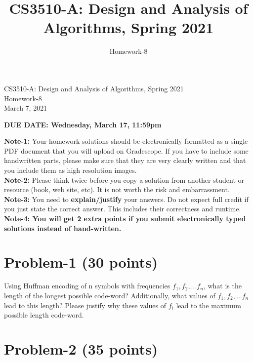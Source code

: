 \documentclass[11pt]{article}
\title{CS3510-A: Design and Analysis of Algorithms, Spring 2021}
\author{Homework-8}
\begin{document}
\begin{center}
    
    \LARGE CS3510-A: Design and Analysis of Algorithms, Spring 2021 \\ \vspace{1em} 
    \large Homework-8 \\ \vspace{0.5em}
    March 7, 2021
\end{center}
\thispagestyle{empty}
\pagestyle{empty}

\noindent
\begin{center}
{\bf DUE DATE: Wednesday, March 17, 11:59pm}
\end{center}

\noindent
{\bf Note-1:} Your homework solutions should be electronically formatted as a single PDF document that you will upload on Gradescope. 
If you have to include some handwritten parts, please make sure that they are very clearly written and that you include them as high resolution images. \\

\noindent
{\bf Note-2:} Please think twice before you copy a solution from another student or resource (book, web site, etc). 
It is not worth the risk and embarrassment. \\

\noindent
{\bf Note-3:} You need to {\bf explain/justify} your answers. Do not expect full credit if you just state the correct answer. This includes their correctness and runtime.\\

\noindent
{\bf Note-4: You will get 2 extra points if you submit electronically typed solutions instead of hand-written.} 

\newpage
\section*{Problem-1 (30 points)}

Using Huffman encoding of n symbols with frequencies $f_1, f_2, ... f_n$, what is the length of the longest possible code-word? Additionally, what values of $f_1, f_2, ... f_n$ lead to this length? Please justify why these values of $f_i$ lead to the maximum possible length code-word.



\newpage
\section*{Problem-2 (35 points)}
\end{document}
